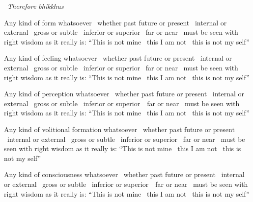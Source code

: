 \begin{english-only-leader}
  \anglebracketleft\ \hspace{-0.5mm}\textit{Therefore bhikkhus} \hspace{-0.5mm}\anglebracketright\
\end{english-only-leader}
\begin{english-only-hangtogether}
  Any kind of form whatsoever \breathmark\ whether past future or present \breathmark\ internal or external \breathmark\ gross or subtle \breathmark\ inferior or superior \breathmark\ far or near \breathmark\ must be seen with right wisdom as it really is: ``This is not mine \breathmark\ this I am not \breathmark\ this is not my self''
\end{english-only-hangtogether}

\begin{english-only-hang}
  Any kind of feeling whatsoever \breathmark\ whether past future or present \breathmark\ internal or external \breathmark\ gross or subtle \breathmark\ inferior or superior \breathmark\ far or near \breathmark\ must be seen with right wisdom as it really is: ``This is not mine \breathmark\ this I am not \breathmark\ this is not my self''
\end{english-only-hang}

\begin{english-only-hang}
  Any kind of perception whatsoever \breathmark\ whether past future or present \breathmark\ internal or external \breathmark\ gross or subtle \breathmark\ inferior or \mbox{superior}~\breathmark\ far or near \breathmark\ must be seen with right wisdom as it really is: ``This is not mine \breathmark\ this I am not \breathmark\ this is not my self''
\end{english-only-hang}

\begin{english-only-hang}
  Any kind of volitional formation whatsoever \breathmark\ whether past future or present \breathmark\ internal or external \breathmark\ gross or subtle \breathmark\ inferior or superior \breathmark\ far or near \breathmark\ must be seen with right wisdom as it really is: ``This is not mine \breathmark\ this I am not \breathmark\ this is not my self''
\end{english-only-hang}

\begin{english-only-hang}
  Any kind of consciousness whatsoever \breathmark\ whether past future or present \breathmark\ internal or external \breathmark\ gross or subtle \breathmark\ inferior or \mbox{superior}~\breathmark\ far or near \breathmark\ must be seen with right wisdom as it really is: ``This is not mine \breathmark\ this I am not \breathmark\ this is not my self''
\end{english-only-hang}

